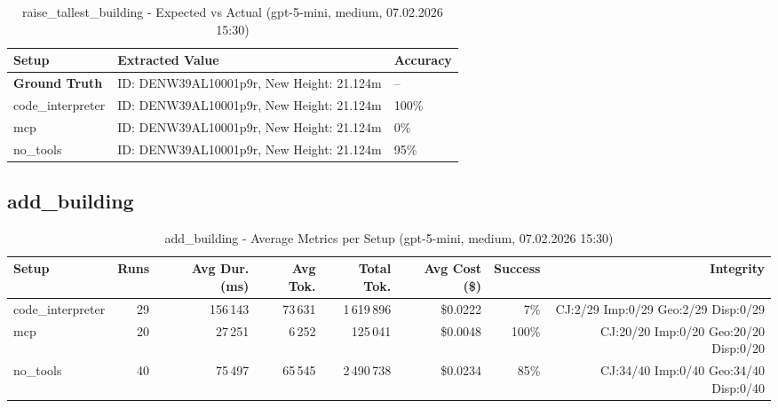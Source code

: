 \documentclass[a4paper,11pt]{article}
\begin{document}
\begin{table}[H]
\centering
\scriptsize
\caption{raise\_tallest\_building - Expected vs Actual (gpt-5-mini, medium, 07.02.2026 15:30)}
\begin{tabular}{l l l}
\toprule
Setup & Extracted Value & Accuracy \\
\midrule
\textbf{Ground Truth} & ID: DENW39AL10001p9r, New Height: 21.124m & -- \\
\midrule
code\_interpreter & ID: DENW39AL10001p9r, New Height: 21.124m & 100\% \\
mcp & ID: DENW39AL10001p9r, New Height: 21.124m & 0\% \\
no\_tools & ID: DENW39AL10001p9r, New Height: 21.124m & 95\% \\
\bottomrule
\end{tabular}
\end{table}

\clearpage

\subsection{add\_building}

\begin{table}[H]
\centering
\scriptsize
\caption{add\_building - Average Metrics per Setup (gpt-5-mini, medium, 07.02.2026 15:30)}
\label{tab:combined\_add\_building\_metrics\_20260207}
\begin{tabular}{l r r r r r r r}
\toprule
Setup & Runs & Avg Dur. (ms) & Avg Tok. & Total Tok. & Avg Cost (\$) & Success & Integrity \\
\midrule
code\_interpreter & 29 & 156\,143 & 73\,631 & 1\,619\,896 & \$0.0222 & 7\% & CJ:2/29 Imp:0/29 Geo:2/29 Disp:0/29 \\
mcp & 20 & 27\,251 & 6\,252 & 125\,041 & \$0.0048 & 100\% & CJ:20/20 Imp:0/20 Geo:20/20 Disp:0/20 \\
no\_tools & 40 & 75\,497 & 65\,545 & 2\,490\,738 & \$0.0234 & 85\% & CJ:34/40 Imp:0/40 Geo:34/40 Disp:0/40 \\
\bottomrule
\end{tabular}
\end{table}
\end{document}
